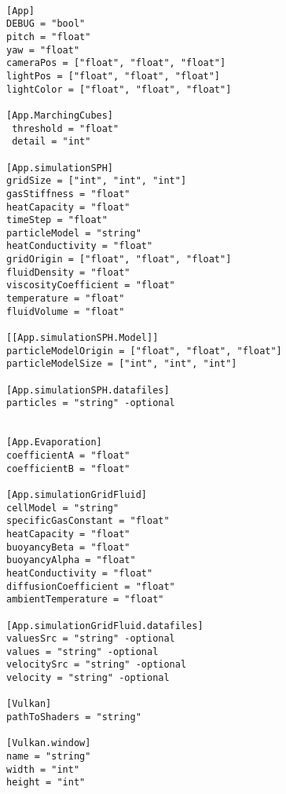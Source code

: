 \begin{lstlisting}

[App]
DEBUG = "bool"
pitch = "float"
yaw = "float"
cameraPos = ["float", "float", "float"]
lightPos = ["float", "float", "float"]
lightColor = ["float", "float", "float"]

[App.MarchingCubes]
 threshold = "float"
 detail = "int"
 
[App.simulationSPH]
gridSize = ["int", "int", "int"]
gasStiffness = "float"
heatCapacity = "float"
timeStep = "float"
particleModel = "string"
heatConductivity = "float"
gridOrigin = ["float", "float", "float"]
fluidDensity = "float"
viscosityCoefficient = "float"
temperature = "float"
fluidVolume = "float"

[[App.simulationSPH.Model]]
particleModelOrigin = ["float", "float", "float"]
particleModelSize = ["int", "int", "int"]

[App.simulationSPH.datafiles]
particles = "string" -optional


[App.Evaporation]
coefficientA = "float"
coefficientB = "float"

[App.simulationGridFluid]
cellModel = "string"
specificGasConstant = "float"
heatCapacity = "float"
buoyancyBeta = "float"
buoyancyAlpha = "float"
heatConductivity = "float"
diffusionCoefficient = "float"
ambientTemperature = "float"

[App.simulationGridFluid.datafiles]
valuesSrc = "string" -optional
values = "string" -optional
velocitySrc = "string" -optional
velocity = "string" -optional

[Vulkan]
pathToShaders = "string"

[Vulkan.window]
name = "string"
width = "int"
height = "int"

\end{lstlisting}



